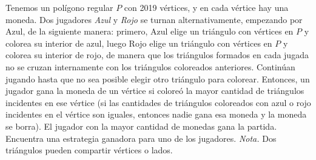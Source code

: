 Tenemos un polígono regular $P$ con 2019 vértices, y en cada vértice hay una moneda. Dos jugadores \textit{Azul} y \textit{Rojo} se turnan alternativamente, empezando por Azul, de la siguiente manera: primero, Azul elige un triángulo con vértices en $P$ y colorea su interior de azul, luego Rojo elige un triángulo con vértices en $P$ y colorea su interior de rojo, de manera que los triángulos formados en cada jugada no se cruzan internamente con los triángulos coloreados anteriores. Continúan jugando hasta que no sea posible elegir otro triángulo para colorear. Entonces, un jugador gana la moneda de un vértice si coloreó la mayor cantidad de triángulos incidentes en ese vértice (si las cantidades de triángulos coloreados con azul o rojo incidentes en el vértice son iguales, entonces nadie gana esa moneda y la moneda se borra). El jugador con la mayor cantidad de monedas gana la partida.  Encuentra una estrategia ganadora para uno de los jugadores. 
\textit{Nota.} Dos triángulos pueden compartir vértices o lados.
